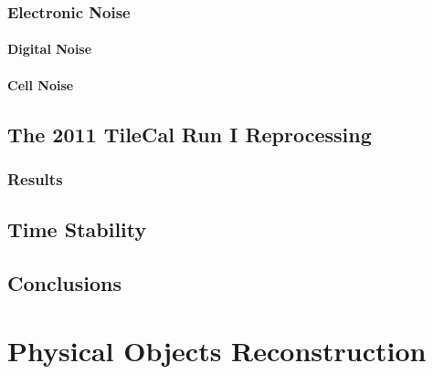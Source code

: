 \documentclass[10pt,twoside,cucitura,classica,english,openany]{toptesi}
\begin{document}
\subsection{Electronic Noise}
\label{sec:electronic-noise}



\subsubsection{Digital Noise}
\label{sec:digital-noise}



\subsubsection{Cell Noise}
\label{sec:cell-noise}



\section{The 2011 TileCal Run I Reprocessing}
\label{sec:2011-tilecal-run}



\subsection{Results}
\label{sec:results-1}



\section{Time Stability}
\label{sec:time-stability}



\section{Conclusions}
\label{sec:conclusions}



\chapter{Physical Objects Reconstruction}
\label{cha:phys-objects-reconst}


\end{document}

